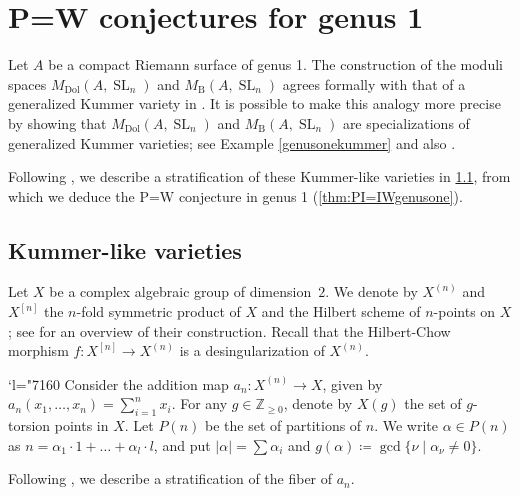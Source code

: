 \documentclass[JEP,XML,SOM,Unicode, NoEqCountersInSection,NoFloatCountersInSection,published]{cedram}
\newcommand{\Changel}{\mathcode`l="7160}
\theoremstyle{definition}
\newcommand{\ZZ}{\mathbb{Z}}
\newcommand{\Sl}{\operatorname{SL}}
\newcommand{\MDolSlone}{{M}_{\mathrm{Dol}}(A, \Sl_n)}
\newcommand{\MBSlone}{{M}_{\mathrm{B}}(A, \Sl_n)}
\begin{document}
\section{P=W conjectures for genus 1}\label{sec:P=W1}
Let $A$ be a compact Riemann surface of genus 1.
The construction of the moduli spaces $\MDolSlone$ and $\MBSlone$ agrees formally with that of a generalized Kummer variety in \cite[\S 7]{Beauville84}. It is possible to make this analogy more precise by showing that $\MDolSlone$ and $\MBSlone$ are specializations of generalized Kummer varieties; see Example \ref{genusonekummer} and also \cite[\S 5.3]{MMS}.

Following \cite{GottscheSoergel93}, we describe a stratification of these Kummer-like varieties in \cref{sec:VarietiesKummertype}, from which we deduce the P=W conjecture in genus 1 (\cref{thm:PI=IWgenusone}).

\subsection{Kummer-like varieties}\label{sec:VarietiesKummertype}
Let $X$ be a complex algebraic group of dimension~$2$. We denote by $X^{(n)}$ and $X^{[n]}$ the $n$-fold symmetric product of $X$ and the Hilbert scheme of $n$-points on $X$; see \cite[\S 6]{Beauville84} for an overview of their construction. Recall that the Hilbert-Chow morphism $f\colon X^{[n]} \to X^{(n)}$ is a desingularization of $X^{(n)}$.

\Changel{}
Consider the addition map $a_n\colon X^{(n)} \to X$, given by $a_n(x_1, \ldots, x_n)= \sum_{i=1}^{n}x_i$. For any $g \in \ZZ_{\geq 0}$, denote by $X(g)$ the set of $g$-torsion points in $X$. Let $P(n)$ be the set of partitions of $n$. We write $\alpha \in P(n)$ as $n=\alpha_1 \cdot 1 + \ldots + \alpha_l \cdot l$, and put $|\alpha|= \sum \alpha_i$ and $g(\alpha)\coloneqq \gcd\{\nu\mid\alpha_{\nu}\neq 0 \}$.

Following \cite{GottscheSoergel93}, we describe a stratification of the fiber of $a_n$.
\end{document}
